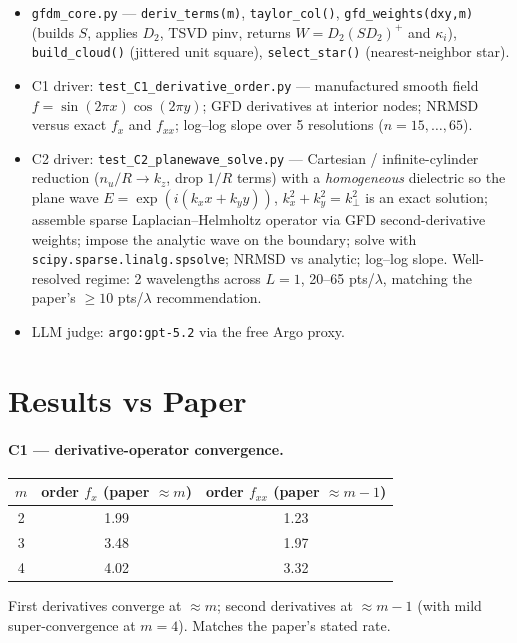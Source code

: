 \documentclass[11pt]{article}
\begin{document}
\begin{itemize}[leftmargin=1.4em]
  \item \texttt{gfdm\_core.py} --- \texttt{deriv\_terms(m)},
        \texttt{taylor\_col()}, \texttt{gfd\_weights(dxy,m)} (builds $S$,
        applies $D_2$, TSVD pinv, returns
        $W=D_2 (SD_2)^{+}$ and $\kappa_i$),
        \texttt{build\_cloud()} (jittered unit square),
        \texttt{select\_star()} (nearest-neighbor star).
  \item C1 driver: \texttt{test\_C1\_derivative\_order.py} --- manufactured
        smooth field $f=\sin(2\pi x)\cos(2\pi y)$; GFD derivatives at interior
        nodes; NRMSD versus exact $f_x$ and $f_{xx}$; log--log slope over
        5 resolutions ($n=15,\dots,65$).
  \item C2 driver: \texttt{test\_C2\_planewave\_solve.py} --- Cartesian /
        infinite-cylinder reduction ($n_u/R\to k_z$, drop $1/R$ terms) with a
        \emph{homogeneous} dielectric so the plane wave
        $E=\exp(i(k_x x + k_y y))$, $k_x^2+k_y^2=k_\perp^2$ is an exact
        solution; assemble sparse Laplacian--Helmholtz operator via GFD
        second-derivative weights; impose the analytic wave on the boundary;
        solve with \texttt{scipy.sparse.linalg.spsolve}; NRMSD vs analytic;
        log--log slope. Well-resolved regime: 2 wavelengths across $L{=}1$,
        20--65 pts/$\lambda$, matching the paper's $\geq 10$ pts/$\lambda$
        recommendation.
  \item LLM judge: \texttt{argo:gpt-5.2} via the free Argo proxy.
\end{itemize}

\section{Results vs Paper}

\paragraph{C1 --- derivative-operator convergence.}
\begin{center}\small
\begin{tabular}{ccc}
\toprule
$m$ & order $f_x$ (paper $\approx m$) & order $f_{xx}$ (paper $\approx m-1$) \\
\midrule
2 & 1.99 & 1.23 \\
3 & 3.48 & 1.97 \\
4 & 4.02 & 3.32 \\
\bottomrule
\end{tabular}
\end{center}
First derivatives converge at $\approx m$; second derivatives at $\approx m-1$
(with mild super-convergence at $m=4$). Matches the paper's stated rate.
\end{document}
